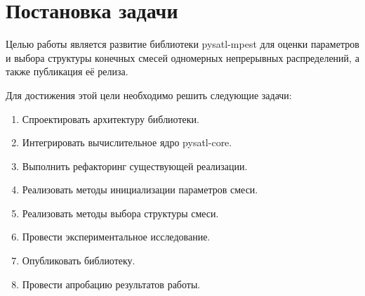 
\section{Постановка задачи}
\label{sec:task}

Целью работы является развитие библиотеки pysatl-mpest для оценки параметров и выбора структуры конечных смесей одномерных непрерывных распределений, а также публикация её релиза.

Для достижения этой цели необходимо решить следующие задачи:

\begin{enumerate}
    \item Спроектировать архитектуру библиотеки.
    \item Интегрировать вычислительное ядро pysatl-core.
    \item Выполнить рефакторинг существующей реализации.
    \item Реализовать методы инициализации параметров смеси.
    \item Реализовать методы выбора структуры смеси.
    \item Провести экспериментальное исследование.
    \item Опубликовать библиотеку.
    \item Провести апробацию результатов работы.
\end{enumerate}
